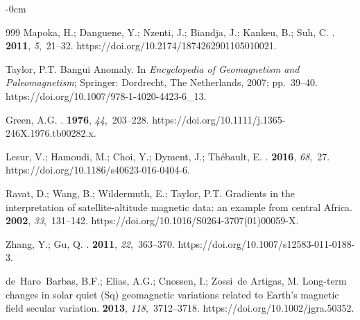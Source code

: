 \documentclass[minerals,article,accept,pdftex,moreauthors]{Definitions/mdpi}
\begin{document}
\begin{adjustwidth}{-\extralength}{0cm}
\begin{thebibliography}{999}
Mapoka, H.; Danguene, Y.; Nzenti, J.; Biandja, J.; Kankeu, B.; Suh, C.
.
 {\bf 2011}, {\em 5},~21--32.
\newblock https://doi.org/10.2174/1874262901105010021.

Taylor, P.T. Bangui Anomaly.
\newblock In {\em Encyclopedia of Geomagnetism and Paleomagnetism}; Springer: Dordrecht,  The Netherlands, 2007; pp.~39--40.
\newblock https://doi.org/10.1007/978-1-4020-4423-6\_13.

Green, A.G.
.
 {\bf 1976}, {\em
  44},~203--228.
\newblock https://doi.org/10.1111/j.1365-246X.1976.tb00282.x.

Lesur, V.; Hamoudi, M.; Choi, Y.; Dyment, J.; Thébault, E.
.
 {\bf 2016}, {\em 68},~27.
\newblock https://doi.org/10.1186/s40623-016-0404-6.

Ravat, D.; Wang, B.; Wildermuth, E.; Taylor, P.T.
\newblock Gradients in the interpretation of satellite-altitude magnetic data:
  an example from central Africa.
 {\bf 2002}, {\em 33},~131--142. %
\newblock   https://doi.org/10.1016/S0264-3707(01)00059-X.

Zhang, Y.; Gu, Q.
.
 {\bf 2011}, {\em 22},~363--370.
\newblock https://doi.org/10.1007/s12583-011-0188-3.

de~Haro~Barbas, B.F.; Elias, A.G.; Cnossen, I.; Zossi~de Artigas, M.
\newblock Long-term changes in solar quiet (Sq) geomagnetic variations related
  to Earth's magnetic field secular variation.
 {\bf 2013}, {\em
  118},~3712--3718.
\newblock https://doi.org/10.1002/jgra.50352.


\end{thebibliography}
\end{adjustwidth}
\end{document}
